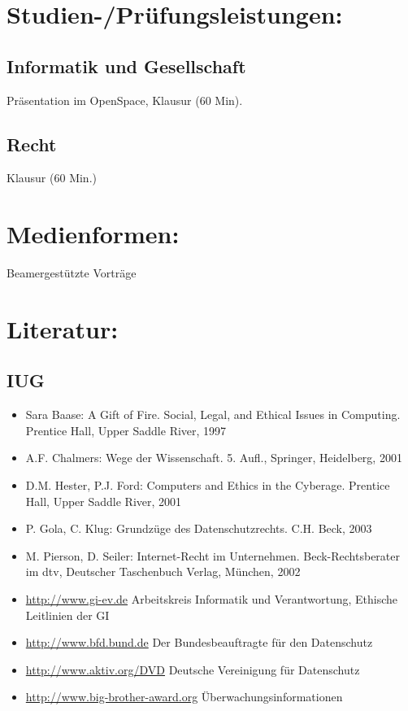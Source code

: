 \section*{Studien-/Prüfungsleistungen:}\label{studien-pruxfcfungsleistungen-11}

\subsection*{Informatik und
Gesellschaft}\label{informatik-und-gesellschaft-1}

Präsentation im OpenSpace, Klausur (60 Min).

\subsection*{Recht}\label{recht-1}

Klausur (60 Min.)

\section*{Medienformen:}\label{medienformen-7}

Beamergestützte Vorträge

\section*{Literatur:}\label{literatur-13}

\subsection*{IUG}\label{iug}

\begin{itemize}
\item
  Sara Baase: A Gift of Fire. Social, Legal, and Ethical Issues in
  Computing. Prentice Hall, Upper Saddle River, 1997
\item
  A.F. Chalmers: Wege der Wissenschaft. 5. Aufl., Springer, Heidelberg,
  2001
\item
  D.M. Hester, P.J. Ford: Computers and Ethics in the Cyberage. Prentice
  Hall, Upper Saddle River, 2001
\item
  P. Gola, C. Klug: Grundzüge des Datenschutzrechts. C.H. Beck, 2003
\item
  M. Pierson, D. Seiler: Internet-Recht im Unternehmen.
  Beck-Rechtsberater im dtv, Deutscher Taschenbuch Verlag, München, 2002
\item
  \url{http://www.gi-ev.de} Arbeitskreis Informatik und Verantwortung,
  Ethische Leitlinien der GI
\item
  \url{http://www.bfd.bund.de} Der Bundesbeauftragte für den Datenschutz
\item
  \url{http://www.aktiv.org/DVD} Deutsche Vereinigung für Datenschutz
\item
  \url{http://www.big-brother-award.org} Überwachungsinformationen
\end{itemize}


